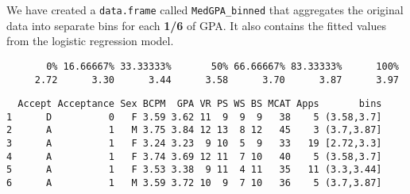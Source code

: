 \documentclass[
]{book}
\newenvironment{Shaded}{\begin{snugshade}}{\end{snugshade}}
\newcommand{\DataTypeTok}[1]{\textcolor[rgb]{0.13,0.29,0.53}{#1}}
\newcommand{\DecValTok}[1]{\textcolor[rgb]{0.00,0.00,0.81}{#1}}
\newcommand{\KeywordTok}[1]{\textcolor[rgb]{0.13,0.29,0.53}{\textbf{#1}}}
\newcommand{\NormalTok}[1]{#1}
\newcommand{\OperatorTok}[1]{\textcolor[rgb]{0.81,0.36,0.00}{\textbf{#1}}}
\newcommand{\OtherTok}[1]{\textcolor[rgb]{0.56,0.35,0.01}{#1}}
\newcommand{\StringTok}[1]{\textcolor[rgb]{0.31,0.60,0.02}{#1}}
\begin{document}
We have created a \texttt{data.frame} called \texttt{MedGPA\_binned} that aggregates the original data into separate bins for each \textbf{1/6} of GPA. It also contains the fitted values from the logistic regression model.

\begin{Shaded}
\end{Shaded}

\begin{verbatim}
       0% 16.66667% 33.33333%       50% 66.66667% 83.33333%      100% 
     2.72      3.30      3.44      3.58      3.70      3.87      3.97 
\end{verbatim}

\begin{Shaded}
\end{Shaded}

\begin{verbatim}
  Accept Acceptance Sex BCPM  GPA VR PS WS BS MCAT Apps       bins
1      D          0   F 3.59 3.62 11  9  9  9   38    5 (3.58,3.7]
2      A          1   M 3.75 3.84 12 13  8 12   45    3 (3.7,3.87]
3      A          1   F 3.24 3.23  9 10  5  9   33   19 [2.72,3.3]
4      A          1   F 3.74 3.69 12 11  7 10   40    5 (3.58,3.7]
5      A          1   F 3.53 3.38  9 11  4 11   35   11 (3.3,3.44]
6      A          1   M 3.59 3.72 10  9  7 10   36    5 (3.7,3.87]
\end{verbatim}

\begin{Shaded}
\end{Shaded}
\end{document}
